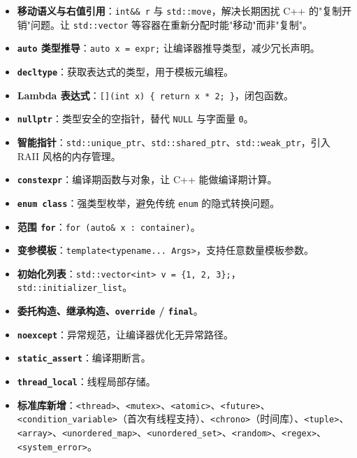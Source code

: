 \documentclass[12pt,a4paper,fontset=fandol]{ctexbook}
\newcommand{\kw}[1]{\texttt{#1}}
\begin{document}
\begin{itemize}
  \item \textbf{移动语义与右值引用}：\kw{int\&\& r} 与 \kw{std::move}，解决长期困扰 C++ 的"复制开销"问题。让 \kw{std::vector} 等容器在重新分配时能"移动"而非"复制"。
  \item \textbf{\kw{auto} 类型推导}：\kw{auto x = expr;} 让编译器推导类型，减少冗长声明。
  \item \textbf{\kw{decltype}}：获取表达式的类型，用于模板元编程。
  \item \textbf{Lambda 表达式}：\kw{[](int x) \{ return x * 2; \}}，闭包函数。
  \item \textbf{\kw{nullptr}}：类型安全的空指针，替代 \kw{NULL} 与字面量 \kw{0}。
  \item \textbf{智能指针}：\kw{std::unique\_ptr}、\kw{std::shared\_ptr}、\kw{std::weak\_ptr}，引入 RAII 风格的内存管理。
  \item \textbf{\kw{constexpr}}：编译期函数与对象，让 C++ 能做编译期计算。
  \item \textbf{\kw{enum class}}：强类型枚举，避免传统 \kw{enum} 的隐式转换问题。
  \item \textbf{范围 \kw{for}}：\kw{for (auto\& x : container)}。
  \item \textbf{变参模板}：\kw{template<typename... Args>}，支持任意数量模板参数。
  \item \textbf{初始化列表}：\kw{std::vector<int> v = \{1, 2, 3\};}，\kw{std::initializer\_list}。
  \item \textbf{委托构造、继承构造、\kw{override} / \kw{final}}。
  \item \textbf{\kw{noexcept}}：异常规范，让编译器优化无异常路径。
  \item \textbf{\kw{static\_assert}}：编译期断言。
  \item \textbf{\kw{thread\_local}}：线程局部存储。
  \item \textbf{标准库新增}：\texttt{<thread>}、\texttt{<mutex>}、\texttt{<atomic>}、\texttt{<future>}、\texttt{<condition\_variable>}（首次有线程支持）、\texttt{<chrono>}（时间库）、\texttt{<tuple>}、\texttt{<array>}、\texttt{<unordered\_map>}、\texttt{<unordered\_set>}、\texttt{<random>}、\texttt{<regex>}、\texttt{<system\_error>}。
\end{itemize}
\end{document}
